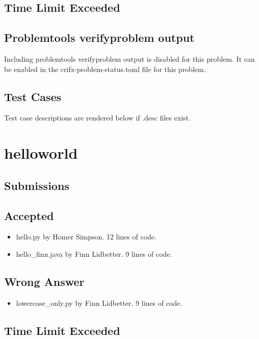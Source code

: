 \documentclass{article}%
\begin{document}
%
\subsection{Time Limit Exceeded}%
\label{subsec:TimeLimitExceeded}%

%
\subsection{Problemtools verifyproblem output}%
\label{subsec:Problemtoolsverifyproblemoutput}%
Including problemtools verifyproblem output is disabled for this problem. It can be enabled in the crifx{-}problem{-}status.toml file for this problem.

%
\subsection{Test Cases}%
\label{subsec:TestCases}%
Test case descriptions are rendered below if .desc files exist.%

%
\newpage%
\section{helloworld}%
\label{sec:helloworld}%
\subsection{Submissions}%
\label{subsec:Submissions}%
\subsection{Accepted}%
\label{subsec:Accepted}%
\begin{itemize}%
\item%
hello.py by Homer Simpson. 12 lines of code.%
\item%
hello\_finn.java by Finn Lidbetter. 9 lines of code.%
\end{itemize}

%
\subsection{Wrong Answer}%
\label{subsec:WrongAnswer}%
\begin{itemize}%
\item%
lowercase\_only.py by Finn Lidbetter. 9 lines of code.%
\end{itemize}

%
\subsection{Time Limit Exceeded}%
\label{subsec:TimeLimitExceeded}%
\end{document}
